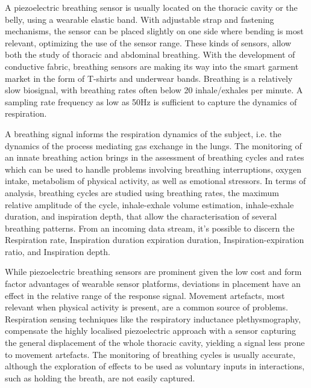 A piezoelectric breathing sensor is usually located on the thoracic cavity or the belly, using a wearable elastic band. With adjustable strap and fastening mechanisms, the sensor can be placed slightly on one side where bending is most relevant, optimizing the use of the sensor range. These kinds of sensors, allow both the study of thoracic and abdominal breathing. With the development of conductive fabric, breathing sensors are making its way into the smart garment market in the form of T-shirts and underwear bands. Breathing is a relatively slow biosignal, with breathing rates often below 20 inhale/exhales per minute. A sampling rate frequency as low as 50Hz is sufficient to capture the dynamics of respiration.

A breathing signal informs the respiration dynamics of the subject, i.e. the dynamics of the process mediating gas exchange in the lungs. The monitoring of an innate breathing action brings in the assessment of breathing cycles and rates which can be used to handle problems involving breathing interruptions, oxygen intake, metabolism of physical activity, as well as emotional stressors. In terms of analysis, breathing cycles are studied using breathing rates, the maximum relative amplitude of the cycle, inhale-exhale volume estimation, inhale-exhale duration, and inspiration depth, that allow the characterisation of several breathing patterns. From an incoming data stream, it's possible to discern the Respiration rate, Inspiration duration expiration duration, Inspiration-expiration ratio, and Inspiration depth.

While piezoelectric breathing sensors are prominent given the low cost and form factor advantages of wearable sensor platforms, deviations in placement have an effect in the relative range of the response signal. Movement artefacts, most relevant when physical activity is present, are a common source of problems. Respiration sensing techniques like the respiratory inductance plethysmography, compensate the highly localised piezoelectric approach with a sensor capturing the general displacement of the whole thoracic cavity, yielding a signal less prone to movement artefacts. The monitoring of breathing cycles is usually accurate, although the exploration of effects to be used as voluntary inputs in interactions, such as holding the breath, are not easily captured. 


